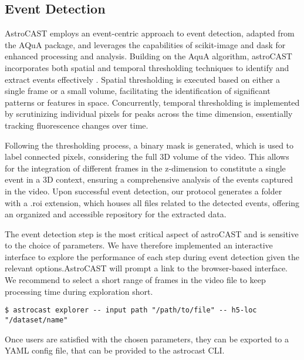 \subsection{Event Detection}

AstroCAST employs an event-centric approach to event detection, adapted from the AQuA package\citep{wang_event-based_2018}, and leverages the capabilities of scikit-image and dask for enhanced processing and analysis\citep{van_der_walt_scikit-image_2014,dask_development_team_dask_2016}. Building on the AquA algorithm, astroCAST incorporates both spatial and temporal thresholding techniques to identify and extract events effectively . Spatial thresholding is executed based on either a single frame or a small volume, facilitating the identification of significant patterns or features in space. Concurrently, temporal thresholding is implemented by scrutinizing individual pixels for peaks across the time dimension, essentially tracking fluorescence changes over time.

Following the thresholding process, a binary mask is generated, which is used to label connected pixels, considering the full 3D volume of the video. This allows for the integration of different frames in the z-dimension to constitute a single event in a 3D context, ensuring a comprehensive analysis of the events captured in the video. Upon successful event detection, our protocol generates a folder with a .roi extension, which houses all files related to the detected events, offering an organized and accessible repository for the extracted data.

The event detection step is the most critical aspect of astroCAST and is sensitive to the choice of parameters. We have therefore implemented an interactive interface to explore the performance of each step during event detection given the relevant options.AstroCAST will prompt a link to the browser-based interface. We recommend to select a short range of frames in the video file to keep processing time during exploration short.

\begin{lstlisting}[style=bashStyle]
    $ astrocast explorer -- input path "/path/to/file" -- h5-loc "/dataset/name"
\end{lstlisting}

Once users are satisfied with the chosen parameters, they can be exported to a YAML config file, that can be provided
to the astrocast \ac{CLI}.


